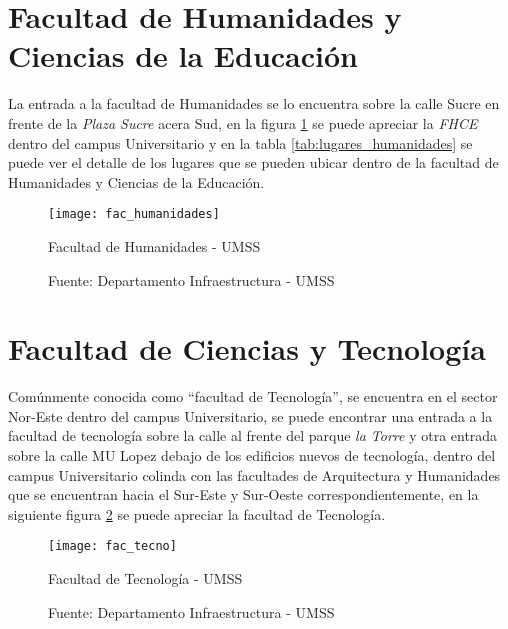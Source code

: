\section{Facultad de Humanidades y Ciencias de la Educación}
\label{sec:facultad_humanidades}

La entrada a la facultad de Humanidades se lo encuentra sobre la calle Sucre en frente de la \emph{Plaza Sucre} acera Sud, en la figura \ref{fig:fac_humanidades} se puede apreciar la \emph{FHCE} dentro del campus Universitario y en la tabla \ref{tab:lugares_humanidades} se puede ver el detalle de los lugares que se pueden ubicar dentro de la facultad de Humanidades y Ciencias de la Educación.

\begin{figure}[H]
 \begin{center}
   \texttt{[image: fac\_humanidades]}
   \caption{Facultad de Humanidades - UMSS}
   \label{fig:fac_humanidades}
   \caption*{Fuente: Departamento Infraestructura - UMSS}
 \end{center}
\end{figure}




\section{Facultad de Ciencias y Tecnología}
\label{sec:facultad_tecnologia}

Comúnmente conocida como ``facultad de Tecnología'',  se encuentra en el sector Nor-Este dentro del campus Universitario, se puede encontrar una entrada a la facultad de tecnología sobre la calle  al frente del parque \emph{la Torre} y otra entrada sobre la calle MU Lopez debajo de los edificios nuevos de tecnología, dentro del campus Universitario colinda con las facultades de Arquitectura y Humanidades que se encuentran hacia el Sur-Este y Sur-Oeste correspondientemente, en la siguiente figura \ref{fig:fac_tecno} se puede apreciar la facultad de Tecnología.

\begin{figure}[H]
 \begin{center}
   \texttt{[image: fac\_tecno]}
   \caption{Facultad de Tecnología - UMSS}
   \label{fig:fac_tecno}
   \caption*{Fuente: Departamento Infraestructura - UMSS}
 \end{center}
\end{figure}

